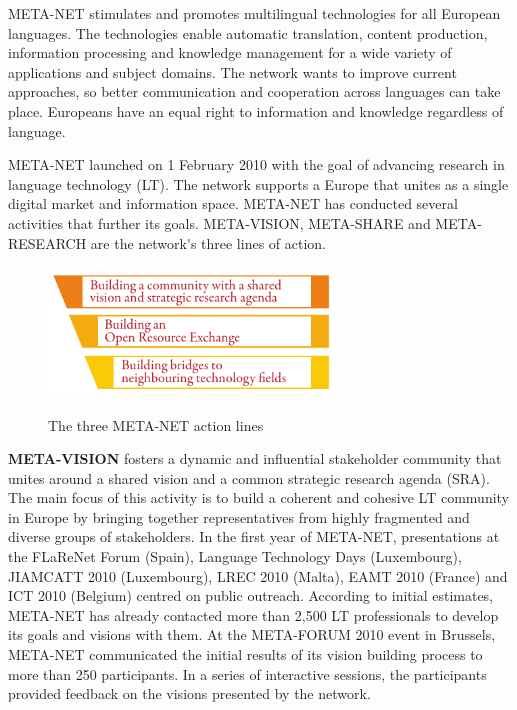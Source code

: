 \documentclass[]{../metanetpaper}
\begin{document}
\begin{multicols}{2}
META-NET stimulates and promotes multilingual technologies for all European languages. The technologies enable automatic translation, content production, information processing and knowledge management for a wide variety of applications and subject domains. The network wants to improve current approaches, so better communication and cooperation across languages can take place. Europeans have an equal right to information and knowledge regardless of language.

META-NET launched on 1 February 2010 with the goal of advancing research in language technology (LT). The network supports a Europe that unites as a single digital market and information space. META-NET has conducted several activities that further its goals. META-VISION, META-SHARE and META-RESEARCH are the network{\mbox '}s three lines of action.

\begin{figure}[!ht]
\begin{center}
  \includegraphics[width=3.0in]{../_media/meta_3lines}\\
  \caption{The three META-NET action lines}
  \label{fig:metanetactionlines}
\end{center}
\end{figure}

\textbf{META-VISION} fosters a dynamic and influential stakeholder community that unites around a shared vision and a common strategic research agenda (SRA). The main focus of this activity is to build a coherent and cohesive LT community in Europe by bringing together representatives from highly fragmented and diverse groups of stakeholders. In the first year of META-NET, presentations at the FLaReNet Forum (Spain), Language Technology Days (Luxembourg), JIAMCATT 2010 (Luxembourg), LREC 2010 (Malta), EAMT 2010 (France) and ICT 2010 (Belgium) centred on public outreach. According to initial estimates, META-NET has already contacted more than 2,500 LT professionals to develop its goals and visions with them. At the META-FORUM 2010 event in Brussels, META-NET communicated the initial results of its vision building process to more than 250 participants. In a series of interactive sessions, the participants provided feedback on the visions presented by the network. 


\end{multicols}
\end{document}

